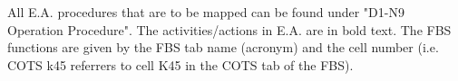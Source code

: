All E.A. procedures that are to be mapped can be found under "D1-N9 Operation Procedure". The activities/actions in E.A. are in bold text. The FBS functions are given by the FBS tab name (acronym) and the cell number (i.e. COTS k45 referrers to cell K45 in the COTS tab of the FBS).


